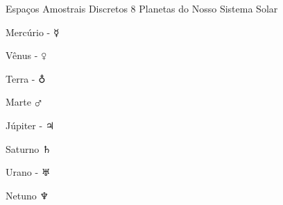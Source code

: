 \begin{frame}{Espaços Amostrais Discretos}
    8 Planetas do Nosso Sistema Solar
    \begin{vfilleditems}
        \item Mercúrio - $\mercury$
        \item Vênus - $\venus$
        \item Terra - $\earth$
        \item Marte $\mars$
        \item Júpiter - $\jupiter$
        \item Saturno $\saturn$
        \item Urano - $\uranus$
        \item Netuno $\neptune$
    \end{vfilleditems}
\end{frame}

